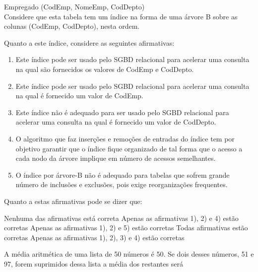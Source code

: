 \documentclass[12pt, addpoints]{exam}
\begin{document}
\begin{questions}
Empregado (CodEmp, NomeEmp, CodDepto)\\

Considere que esta tabela tem um índice na forma de uma árvore B sobre as colunas (CodEmp, CodDepto), nesta ordem.

Quanto a este índice, considere as seguintes afirmativas:

\begin{enumerate}

    \item Este índice pode ser usado pelo SGBD relacional para acelerar uma consulta na qual são fornecidos os valores de CodEmp e CodDepto.

    \item Este índice pode ser usado pelo SGBD relacional para acelerar uma consulta na qual é fornecido um valor de CodEmp.

    \item Este índice não é adequado para ser usado pelo SGBD relacional para acelerar uma consulta na qual é fornecido um valor de CodDepto.

    \item O algoritmo que faz inserções e remoções de entradas do índice tem por objetivo garantir que o índice fique organizado de tal forma que o acesso a cada nodo da árvore implique em número de acessos semelhantes.

    \item O índice por árvore-B não é adequado para tabelas que sofrem grande número de inclusões e exclusões, pois exige reorganizações frequentes.

\end{enumerate}





Quanto a estas afirmativas pode se dizer que:
\begin{choices}
\choice Nenhuma das afirmativas está correta
\choice Apenas as afirmativas 1), 2) e 4) estão corretas
\choice Apenas as afirmativas 1), 2) e 5) estão corretas
\choice Todas afirmativas estão corretas
\choice Apenas as afirmativas 1), 2), 3) e 4) estão corretas
\end{choices}

\question

A média aritmética de uma lista de 50 números é 50. Se dois desses números, 51 e 97, forem suprimidos dessa lista a média dos restantes será


\begin{choices}
\end{choices}


\end{questions}
\end{document}
